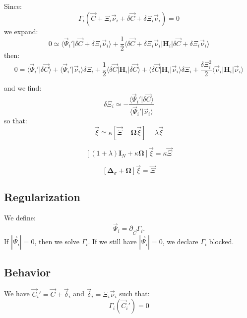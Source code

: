 \documentclass[aps,12pt]{revtex4}
\begin{document}
Since:
\begin{equation}
	\Gamma_i(\vec{C} + \Xi_i \vec{\nu}_i + \delta\vec{C} + \delta\Xi_i \vec{\nu}_i) = 0
\end{equation}
we expand:
\begin{equation}
	0 \simeq \langle \vec{\Psi}_i' \vert \delta\vec{C} + \delta\Xi_i \vec{\nu}_i \rangle
	+ \dfrac{1}{2} \langle  \delta\vec{C} + \delta\Xi_i \vec{\nu}_i \vert \bm{H}_i \vert  \delta\vec{C} + \delta\Xi_i \vec{\nu}_i\rangle
\end{equation}
then:
\begin{equation}
	0 = \langle \vec{\Psi}_i' \vert \delta\vec{C}\rangle + \langle \vec{\Psi}_i' \vert \vec{\nu}_i \rangle \delta \Xi_i 
	+ \dfrac{1}{2} \langle \delta\vec{C} \vert \bm{H}_i \vert \delta\vec{C} \rangle
	+ \langle \delta\vec{C} \vert \bm{H}_i \vert \vec{\nu}_i \rangle \delta \Xi_i
	+ \dfrac{\delta\Xi_i^2}{2} \langle \vec{\nu}_i \vert \bm{H}_i \vert \vec{\nu}_i \rangle
\end{equation}


and we find:
\begin{equation}
	\delta \Xi_i \simeq - \dfrac{\langle \vec{\Psi}_i' \vert \delta\vec{C}\rangle}{\langle \vec{\Psi}_i' \vert \vec{\nu}_i \rangle}
\end{equation}
so that:
\begin{equation}
	 \vec{\xi} \simeq \kappa \left[ \vec{\Xi} - \bm{\Omega}\vec{\xi} \right] - \lambda \vec{\xi}
\end{equation} 

\begin{equation}
	\left[ (1+\lambda) \bm{I}_N + \kappa \bm{\Omega} \right] \vec{\xi} = \kappa \vec{\Xi}
\end{equation}

\begin{equation}
	\left[ \bm{\Delta}_\sigma + \bm{\Omega} \right] \vec{\xi} = \vec{\Xi}
\end{equation}


\subsection{Regularization}
We define:
\begin{equation}
\vec{\Psi}_i = \partial_{\vec{C}} \Gamma_i.
\end{equation}
If $|\vec{\Psi}_i|=0$, then we solve $\Gamma_i$. If we still have $|\vec{\Psi}_i|=0$, we declare $\Gamma_i$ blocked.

\subsection{Behavior}
We have $\vec{C}_i'=\vec{C} + \vec{\delta}_i$ and $\vec{\delta}_i = \Xi_i \vec{\nu}_i$ such that:
\begin{equation}
	\Gamma_i(\vec{C}_i') = 0
\end{equation}
\end{document}
